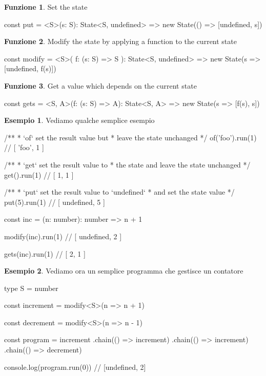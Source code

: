 \documentclass[12pt]{article}
\theoremstyle{definition}
\newtheorem{example}{Esempio}[section]
\newtheorem{function}{Funzione}[section]
\newenvironment{code}
  {\vspace{0.5cm} \VerbatimEnvironment\begin{typescriptcode}}
  {\end{typescriptcode} \vspace{0.2cm}}
\begin{document}
\begin{function}
Set the state

\begin{code}
const put = <S>(s: S): State<S, undefined> =>
  new State(() => [undefined, s])
\end{code}
\end{function}

\begin{function}
Modify the state by applying a function to the current state

\begin{code}
const modify = <S>(
  f: (s: S) => S
): State<S, undefined> => new State(s => [undefined, f(s)])
\end{code}
\end{function}

\begin{function}
Get a value which depends on the current state

\begin{code}
const gets = <S, A>(f: (s: S) => A): State<S, A> =>
  new State(s => [f(s), s])
\end{code}
\end{function}

\begin{example}
Vediamo qualche semplice esempio

\begin{code}
/**
 * `of` set the result value but
 * leave the state unchanged
 */
of('foo').run(1) // [ 'foo', 1 ]

/**
 * `get` set the result value to
 * the state and leave the state unchanged
 */
get().run(1) // [ 1, 1 ]

/**
 * `put` set the result value to `undefined`
 * and set the state value
 */
put(5).run(1) // [ undefined, 5 ]

const inc = (n: number): number => n + 1

modify(inc).run(1) // [ undefined, 2 ]

gets(inc).run(1) // [ 2, 1 ]
\end{code}
\end{example}

\begin{example}
Vediamo ora un semplice programma che gestisce un contatore

\begin{code}
type S = number

const increment = modify<S>(n => n + 1)

const decrement = modify<S>(n => n - 1)

const program = increment
  .chain(() => increment)
  .chain(() => increment)
  .chain(() => decrement)

console.log(program.run(0)) // [undefined, 2]
\end{code}
\end{example}
\end{document}
